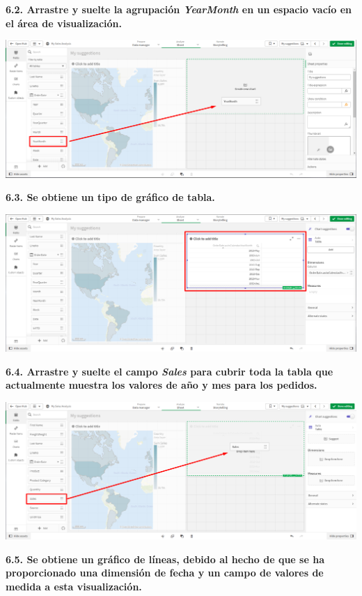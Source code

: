 \documentclass{article}
\begin{document}
\textbf{6.2. Arrastre y suelte la agrupación \textit{YearMonth} 
en un espacio vacío en el área de visualización.}

    \begin{center}
		\includegraphics[width=14cm]{./images/19.1} 
	\end{center}

\newpage
\textbf{6.3. Se obtiene un tipo de gráfico de tabla. }

    \begin{center}
		\includegraphics[width=14cm]{./images/19.2} 
	\end{center}

\textbf{6.4. Arrastre y suelte el campo \textit{Sales} para 
cubrir toda la tabla que actualmente muestra los valores de año y 
mes para los pedidos. }

    \begin{center}
		\includegraphics[width=14cm]{./images/20} 
	\end{center}
\newpage
\textbf{6.5. Se obtiene un gráfico de líneas, debido al
 hecho de que se ha proporcionado una dimensión de fecha 
y un campo de valores de medida a esta visualización.}
\end{document}
